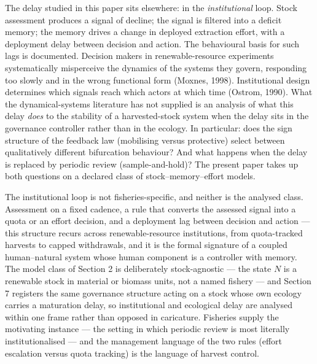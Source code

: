 \documentclass[11pt]{article}
\begin{document}
The delay studied in this paper sits elsewhere: in the
\emph{institutional} loop. Stock assessment produces a signal of
decline; the signal is filtered into a deficit memory; the memory drives
a change in deployed extraction effort, with a deployment delay between
decision and action. The behavioural basis for such lags is documented.
Decision makers in renewable-resource experiments systematically
misperceive the dynamics of the systems they govern, responding too
slowly and in the wrong functional form (Moxnes, 1998). Institutional
design determines which signals reach which actors at which time
(Ostrom, 1990). What the dynamical-systems literature has not supplied
is an analysis of what this delay \emph{does} to the stability of a
harvested-stock system when the delay sits in the governance controller
rather than in the ecology. In particular: does the sign structure of
the feedback law (mobilising versus protective) select between
qualitatively different bifurcation behaviour? And what happens when the
delay is replaced by periodic review (sample-and-hold)? The present
paper takes up both questions on a declared class of
stock--memory--effort models.

The institutional loop is not fisheries-specific, and neither is the
analysed class. Assessment on a fixed cadence, a rule that converts the
assessed signal into a quota or an effort decision, and a deployment lag
between decision and action --- this structure recurs across
renewable-resource institutions, from quota-tracked harvests to capped
withdrawals, and it is the formal signature of a coupled human--natural
system whose human component is a controller with memory. The model
class of Section 2 is deliberately stock-agnostic --- the state \(N\) is
a renewable stock in material or biomass units, not a named fishery ---
and Section 7 registers the same governance structure acting on a stock
whose own ecology carries a maturation delay, so institutional and
ecological delay are analysed within one frame rather than opposed in
caricature. Fisheries supply the motivating instance --- the setting in
which periodic review is most literally institutionalised --- and the
management language of the two rules (effort escalation versus quota
tracking) is the language of harvest control.
\end{document}
